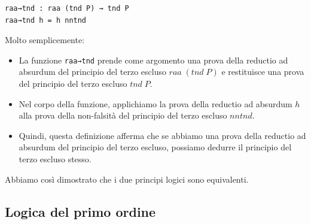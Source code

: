 \documentclass[a4paper]{article}
\theoremstyle{definition}
\theoremstyle{remark}
\begin{document}
\begin{verbatim}
raa→tnd : raa (tnd P) → tnd P
raa→tnd h = h nntnd
\end{verbatim}
Molto semplicemente:
\begin{itemize}
  \item La funzione \texttt{raa→tnd} prende come argomento una prova della reductio ad absurdum del principio del terzo escluso \( raa \; (tnd \; P) \) e restituisce una prova del principio del terzo escluso \( tnd \; P \).
  \item Nel corpo della funzione, applichiamo la prova della reductio ad absurdum \( h \) alla prova della non-falsità del principio del terzo escluso \( nntnd \).
  \item Quindi, questa definizione afferma che se abbiamo una prova della reductio ad absurdum del principio del terzo escluso, possiamo dedurre il principio del terzo escluso stesso.
\end{itemize}
Abbiamo così dimostrato che i due principi logici sono equivalenti.

\subsection{Logica del primo ordine}
\end{document}
